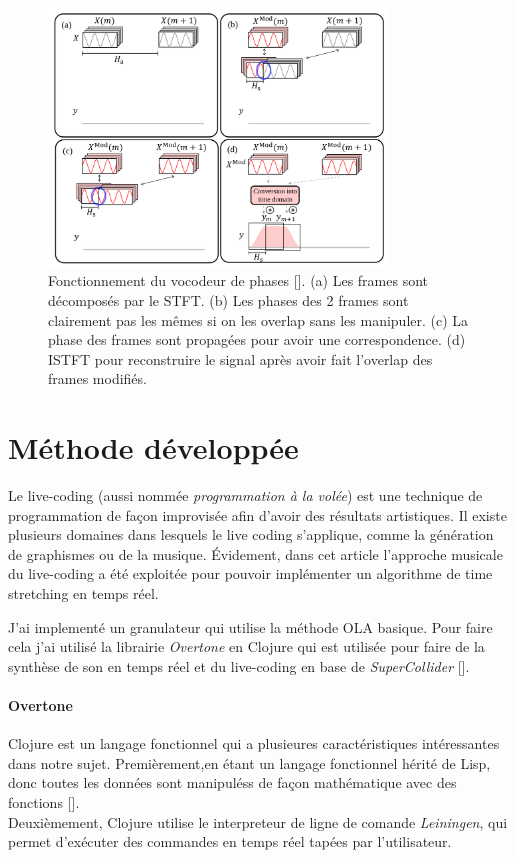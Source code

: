 \documentclass[letterpaper]{article}
\begin{document}
\begin{figure}[h]
    \centerline{\includegraphics[width=9cm]{res/phasevocoder.png}}
    \caption{\label{fig:phasevocoder}
      Fonctionnement du vocodeur de phases [\cite{TSMreview}]. (a) Les frames sont décomposés par le STFT. (b) Les phases des 2 frames sont clairement pas les mêmes si on les overlap sans les manipuler. (c) La phase des frames sont propagées pour avoir une correspondence. (d) ISTFT pour reconstruire le signal après avoir fait l'overlap des frames modifiés.}
  \end{figure}

\section{Méthode développée}


Le live-coding (aussi nommée \emph{programmation à la volée}) est une technique de programmation de
façon improvisée afin d'avoir des résultats artistiques. Il existe plusieurs domaines dans lesquels
le live coding s'applique, comme la génération de graphismes ou de la musique. Évidement, dans cet
article l'approche musicale du live-coding a été exploitée pour pouvoir implémenter un algorithme
de time stretching en temps réel.

J'ai implementé un granulateur qui utilise la méthode OLA basique. Pour faire cela j'ai utilisé la
librairie \emph{Overtone} en Clojure qui est utilisée pour faire de la synthèse de son en temps
réel et du live-coding en base de \emph{SuperCollider} [\cite{SonicPI}].

\paragraph {Overtone}

Clojure est un langage fonctionnel qui a plusieures caractéristiques intéressantes dans notre sujet.
Premièrement,en étant un langage fonctionnel hérité de Lisp, donc toutes les données sont manipuléss
de façon mathématique avec des fonctions [\cite{Clojure}].\\
Deuxièmement, Clojure utilise le interpreteur de ligne de comande \emph{Leiningen}, qui permet
d'exécuter des commandes en temps réel tapées par l'utilisateur.
\end{document}
